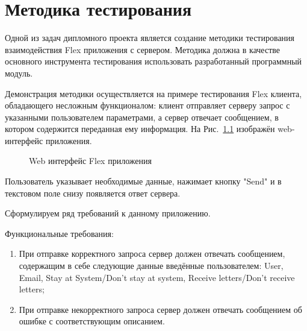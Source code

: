 \chapter{Методика тестирования}

Одной из задач дипломного проекта является создание методики тестирования взаимодействия Flex приложения
с сервером. Методика должна в качестве основного инструмента тестирования использовать разработанный программный модуль.

Демонстрация методики осуществляется на примере тестирования Flex клиента, обладающего
несложным функционалом: клиент отправляет серверу запрос с указанными пользователем параметрами, а сервер отвечает
сообщением, в котором содержится переданная ему информация. На Рис.~\ref{ris:flexClient.png} изображён web-интерфейс приложения.

\begin{figure}[ht]
\caption{Web интерфейс Flex приложения}
\label{ris:flexClient.png}
\end{figure}

Пользователь указывает необходимые данные, нажимает кнопку "Send" и в текстовом поле снизу появляется
ответ сервера.

Сформулируем ряд требований к данному приложению.

Функциональные требования:

\begin{enumerate}
\item При отправке корректного запроса сервер должен отвечать сообщением, содержащим в себе следующие
данные введённые пользователем: User, Email, Stay at System/Don't stay at system, Receive letters/Don't
receive letters;
\item При отправке некорректного запроса сервер должен отвечать сообщением об ошибке с соответствующим
описанием.
\end{enumerate}


